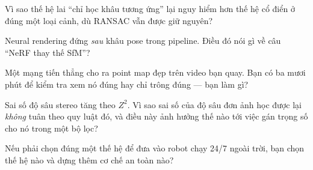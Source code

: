 \documentclass[../../../deep_learning.tex]{subfiles}
\begin{document}
\begin{tukiem}
\item Vì sao thế hệ lai ``chỉ học khâu tương ứng'' lại nguy hiểm hơn thế hệ cổ điển ở đúng một loại cảnh, dù RANSAC vẫn được giữ nguyên?
\item Neural rendering đứng \emph{sau} khâu pose trong pipeline. Điều đó nói gì về câu ``NeRF thay thế SfM''?
\item Một mạng tiến thẳng cho ra point map đẹp trên video bạn quay. Bạn có ba mươi phút để kiểm tra xem nó đúng hay chỉ trông đúng --- bạn làm gì?
\item Sai số độ sâu stereo tăng theo \(Z^{2}\). Vì sao sai số của độ sâu đơn ảnh học được lại \emph{không} tuân theo quy luật đó, và điều này ảnh hưởng thế nào tới việc gán trọng số cho nó trong một bộ lọc?
\item Nếu phải chọn đúng một thế hệ để đưa vào robot chạy 24/7 ngoài trời, bạn chọn thế hệ nào và dựng thêm cơ chế an toàn nào?
\end{tukiem}
\ifSubfilesClassLoaded{\printbibliography[title={Nguồn}]}{}
\end{document}
